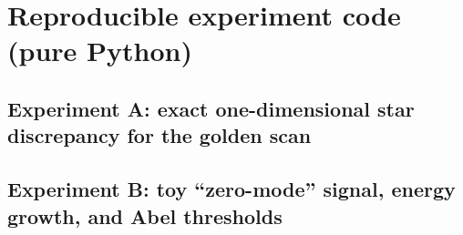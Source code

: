 
\section{Reproducible experiment code (pure Python)}
\label{app:code}

\subsection{Experiment A: exact one-dimensional star discrepancy for the golden scan}
\label{app:code_expA}


\subsection{Experiment B: toy ``zero-mode'' signal, energy growth, and Abel thresholds}
\label{app:code_expB}



